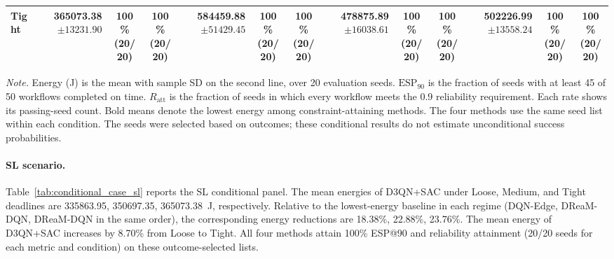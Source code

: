 \documentclass[10pt]{article}
\begin{document}
\begin{table}[!htbp]
\begin{tabular}{@{}l*{4}{rcc}@{}}
Tight & \shortstack[r]{\textbf{365073.38}\\$\pm 13231.90$} & \shortstack[c]{100\%\\(20/20)} & \shortstack[c]{100\%\\(20/20)} & \shortstack[r]{584459.88\\$\pm 51429.45$} & \shortstack[c]{100\%\\(20/20)} & \shortstack[c]{100\%\\(20/20)} & \shortstack[r]{478875.89\\$\pm 16038.61$} & \shortstack[c]{100\%\\(20/20)} & \shortstack[c]{100\%\\(20/20)} & \shortstack[r]{502226.99\\$\pm 13558.24$} & \shortstack[c]{100\%\\(20/20)} & \shortstack[c]{100\%\\(20/20)} \\
\bottomrule
\end{tabular}
\par\vspace{3pt}
\parbox{\textwidth}{\footnotesize
\textit{Note.} Energy (J) is the mean with sample SD on the second line, over 20 evaluation seeds.
$\mathrm{ESP}_{90}$ is the fraction of seeds with at least 45 of 50 workflows completed on time.
$R_{\mathrm{att}}$ is the fraction of seeds in which every workflow meets the 0.9 reliability requirement.
Each rate shows its passing-seed count. Bold means denote the lowest energy among constraint-attaining methods.
The four methods use the same seed list within each condition.
The seeds were selected based on outcomes; these conditional results do not estimate unconditional success probabilities.}
\endgroup
\end{table}

\paragraph{SL scenario.}
Table~\ref{tab:conditional_case_sl} reports the SL conditional panel. The mean energies of D3QN+SAC under Loose, Medium, and Tight deadlines are 335863.95, 350697.35, 365073.38~J, respectively. Relative to the lowest-energy baseline in each regime (DQN-Edge, DReaM-DQN, DReaM-DQN in the same order), the corresponding energy reductions are 18.38\%, 22.88\%, 23.76\%. The mean energy of D3QN+SAC increases by 8.70\% from Loose to Tight. All four methods attain 100\% ESP@90 and reliability attainment (20/20 seeds for each metric and condition) on these outcome-selected lists.
\end{document}
